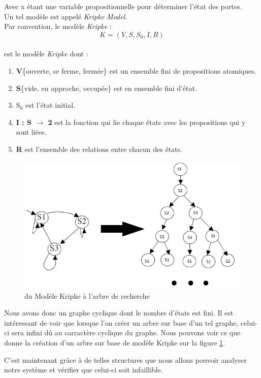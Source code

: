 \documentclass[runningheads,a4paper]{llncs}
\begin{document}
\noindent Avec x étant une variable propositionnelle pour déterminer l'état des portes.\\
Un tel modèle est appelé \textit{Kripke Model}.\\
Par convention, le modèle \textit{Kripke} : $$K = (V, S, S_{0}, I, R)$$ \\
est le modèle \textit{Kripke} dont :
\begin{enumerate}
\item \textbf{V}\{ouverte, se ferme, fermée\} est un ensemble fini de propositions atomiques.
\item \textbf{S}\{vide, en approche, occupée\} est en ensemble fini d'état.
\item \textbf{$\textrm{S}_\textrm{0}$} est l'état initial.
\item \textbf{I : S $\rightarrow$ 2} est la fonction qui lie chaque états avec les propositions qui y sont liées.
\item \textbf{R} est l'ensemble des relations entre chacun des états.
\end{enumerate}

\begin{figure}[!h]
	\includegraphics[scale=0.4]{kripke.png}
	\centering
	\caption{du Modèle Kripke à l'arbre de recherche}
	\label{label-image4}
\end{figure}

\noindent Nous avons donc un graphe cyclique dont le nombre d'états est fini. Il est intéressant de voir que lorsque l'on créer un arbre sur base d'un tel graphe, celui-ci sera infini dû au carractère cyclique du graphe. Nous pouvons voir ce que donne la création d'un arbre sur base de modèle Kripke sur la figure \ref{label-image4}.



\noindent C'est maintenant grâce à de telles structures que nous allons pouvoir analyser notre système et vérifier que celui-ci soit infaillible.
\end{document}
